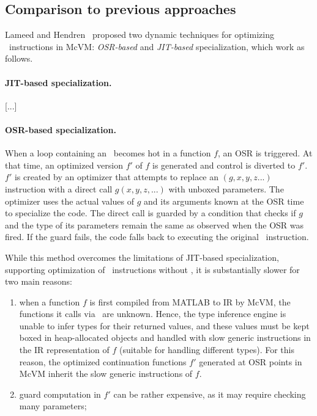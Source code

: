 
\subsection{Comparison to previous approaches}
\label{ss:prev-eval-sol}

Lameed and Hendren~\cite{lameed2013feval} proposed two dynamic techniques for optimizing \feval\ instructions in McVM: {\em OSR-based} and {\em JIT-based} specialization, which work as follows.

\paragraph{JIT-based specialization.}  

[...]

\paragraph{OSR-based specialization.} When a loop containing an \feval\ becomes hot in a function $f$, an OSR is triggered. At that time, an optimized version $f'$ of $f$ is generated and control is diverted to $f'$. $f'$ is created by an optimizer that attempts to replace an \feval$(g,x,y,z...)$ instruction with a direct call $g(x,y,z,...)$ with unboxed parameters. The optimizer uses the actual values of $g$ and its arguments known at the OSR time to specialize the code. The direct call is guarded by a condition that checks if $g$ and the type of its parameters remain the same as observed when the OSR was fired. If the guard fails, the code falls back to executing the original \feval\ instruction.

While this method overcomes the limitations of JIT-based specialization, supporting optimization of \feval\ instructions without , it is substantially slower for two main reasons:
\begin{enumerate}
\item when a function $f$ is first compiled from MATLAB to IR by McVM, the functions it calls via \feval\ are unknown. Hence, the type inference engine is unable to infer types for their returned values, and these values must be kept boxed in heap-allocated objects and handled with slow generic instructions in the IR representation of $f$ (suitable for handling different types). For this reason, the optimized continuation functions $f'$ generated at OSR points in McVM inherit the slow generic instructions of $f$.
\item guard computation in $f'$ can be rather expensive, as it may require checking many parameters;
\end{enumerate}

